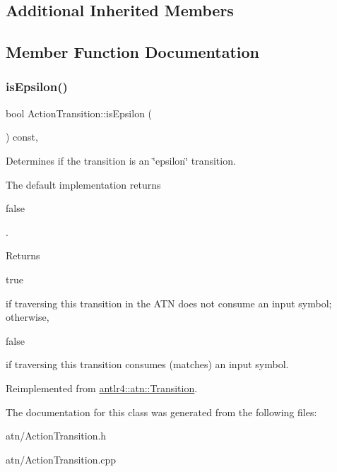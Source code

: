 \subsection*{Additional Inherited Members}


\subsection{Member Function Documentation}
\mbox{\label{classantlr4_1_1atn_1_1ActionTransition_a995b2814e1d1751f39655f6856572584}} 
\subsubsection{\texorpdfstring{is\+Epsilon()}{isEpsilon()}}
{\footnotesize\ttfamily bool Action\+Transition\+::is\+Epsilon (\begin{DoxyParamCaption}{ }\end{DoxyParamCaption}) const\hspace{0.3cm}{\ttfamily [override]}, {\ttfamily [virtual]}}

Determines if the transition is an \char`\"{}epsilon\char`\"{} transition.

The default implementation returns
\begin{DoxyCode}
\textcolor{keyword}{false} 
\end{DoxyCode}
 .

\begin{DoxyReturn}{Returns}

\begin{DoxyCode}
\textcolor{keyword}{true} 
\end{DoxyCode}
 if traversing this transition in the A\+TN does not consume an input symbol; otherwise,
\begin{DoxyCode}
\textcolor{keyword}{false} 
\end{DoxyCode}
 if traversing this transition consumes (matches) an input symbol. 
\end{DoxyReturn}


Reimplemented from \hyperlink{classantlr4_1_1atn_1_1Transition_a8e712c7a46586d73c054c56f481b1be7}{antlr4\+::atn\+::\+Transition}.



The documentation for this class was generated from the following files\+:\begin{DoxyCompactItemize}
\item 
atn/Action\+Transition.\+h\item 
atn/Action\+Transition.\+cpp\end{DoxyCompactItemize}
